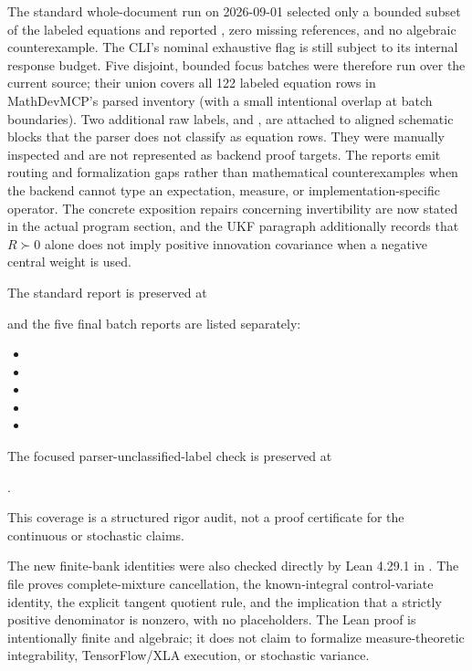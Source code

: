 \documentclass[11pt]{article}
\begin{document}
The standard whole-document run on 2026-09-01 selected only a bounded subset
of the labeled equations and reported , zero missing
references, and no algebraic counterexample.  The CLI's nominal exhaustive
flag is still subject to its internal response budget.  Five disjoint,
bounded focus batches were therefore run over the current source; their union
covers all 122 labeled equation rows in MathDevMCP's parsed inventory (with a
small intentional overlap at batch boundaries).  Two additional raw
 labels,  and
, are attached to aligned schematic blocks that
the parser does not classify as equation rows.  They were manually inspected
and are not represented as backend proof targets.  The reports emit routing
and formalization gaps rather than mathematical counterexamples when the
backend cannot type an expectation, measure, or implementation-specific
operator.  The concrete exposition repairs concerning invertibility are now
stated in the actual program section, and the UKF paragraph additionally
records that $R\succ0$ alone does not imply positive innovation covariance
when a negative central weight is used.

The standard report is preserved at
\begin{center}
\end{center}
and the five final batch reports are listed separately:
\begin{itemize}
\item {}
\item {}
\item {}
\item {}
\item {}
\end{itemize}
The focused parser-unclassified-label check is preserved at
\begin{center}
.
\end{center}
This coverage is a structured rigor audit, not a proof certificate for the
continuous or stochastic claims.

The new finite-bank identities were also checked directly by Lean 4.29.1 in
.  The file
proves complete-mixture cancellation, the known-integral control-variate
identity, the explicit tangent quotient rule, and the implication that a
strictly positive denominator is nonzero, with no placeholders.  The Lean
proof is intentionally finite and algebraic; it does not claim to formalize
measure-theoretic integrability, TensorFlow/XLA execution, or stochastic
variance.
\end{document}
